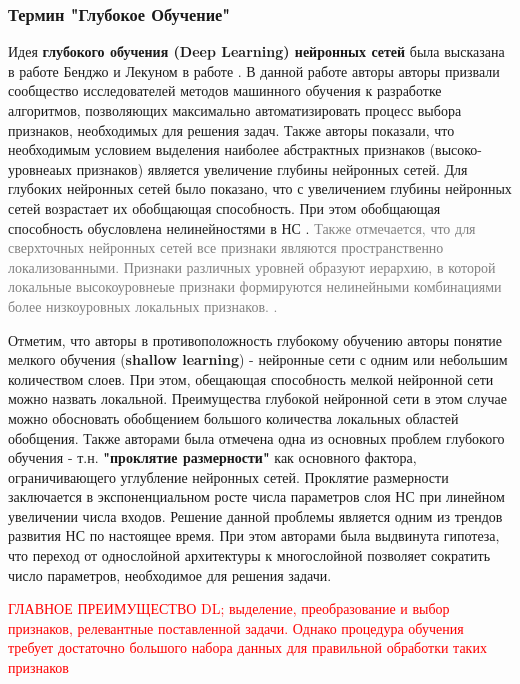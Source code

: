 \documentclass[12pt]{article}
\begin{document}
\begin{sloppypar}
\subsubsection{Термин "Глубокое Обучение"}
 Идея \textbf{глубокого обучения (Deep Learning) нейронных сетей} была высказана в работе Бенджо и Лекуном в работе \cite{bengio2007scaling}. В данной работе авторы авторы призвали сообщество исследователей методов машинного обучения к разработке алгоритмов, позволяющих максимально автоматизировать процесс выбора признаков, необходимых для решения задач. Также авторы показали, что необходимым условием выделения наиболее абстрактных признаков (высоко-уровнеаых признаков) является увеличение глубины нейронных сетей.  Для глубоких нейронных сетей было показано, что с увеличением глубины нейронных сетей возрастает их обобщающая способность. При этом обобщающая способность обусловлена нелинейностями в НС \cite{bengio2007scaling}.
\textcolor{gray}{
Также отмечается, что для сверхточных нейронных сетей все признаки являются пространственно локализованными. Признаки различных уровней образуют иерархию, в которой  локальные высокоуровнеые признаки формируются нелинейными комбинациями более низкоуровных локальных признаков.  \cite{lecun2015deep}.}

Отметим, что авторы \cite{bengio2007scaling} в противоположность глубокому обучению авторы понятие мелкого обучения (\textbf{shallow learning}) - нейронные сети с одним или небольшим количеством слоев. При этом, обещающая способность мелкой нейронной сети можно назвать локальной. Преимущества глубокой нейронной сети в этом случае можно обосновать обобщением большого количества локальных областей обобщения. Также авторами \cite{bengio2007scaling} была отмечена одна из основных проблем глубокого обучения - т.н. \textbf{"проклятие размерности"} как основного фактора, ограничивающего углубление нейронных сетей. Проклятие размерности заключается в экспоненциальном росте числа параметров слоя НС при линейном увеличении числа входов. Решение данной проблемы является одним из трендов развития НС по настоящее время. При этом авторами \cite{bengio2007scaling} была выдвинута гипотеза, что переход от однослойной архитектуры к многослойной позволяет сократить число параметров, необходимое для решения задачи. 

\textcolor{red}{
ГЛАВНОЕ ПРЕИМУЩЕСТВО DL; выделение, преобразование и выбор признаков, релевантные поставленной задачи. Однако процедура обучения требует достаточно большого набора данных для правильной обработки таких  признаков  }
\newpage

\end{sloppypar}
\end{document}
